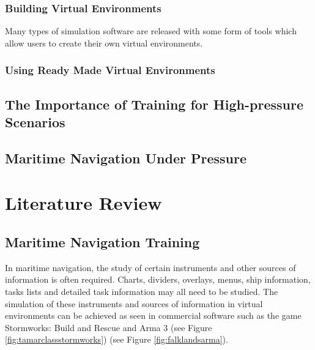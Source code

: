 \documentclass[12pt]{article}
\begin{document}
\subsubsection{Building Virtual Environments}

Many types of simulation software are released with some form of tools which allow users to create their own virtual environments.

\subsubsection{Using Ready Made Virtual Environments}

\subsection{The Importance of Training for High-pressure Scenarios}

\subsection{Maritime Navigation Under Pressure} 

\section{Literature Review}

\subsection{Maritime Navigation Training}

In maritime navigation, the study of certain instruments and other sources of information is often required. Charts, dividers, overlays, menus, ship information, tasks lists and detailed task information may all need to be studied. \cite{atik2019use} The simulation of these instruments and sources of information in virtual environments can be achieved as seen in commercial software such as the game Stormworks: Build and Rescue \cite{stormworks} and Arma 3 \cite{arma3} (see Figure \ref{fig:tamarclassstormworks}) (see Figure \ref{fig:falklandsarma}).
\end{document}
